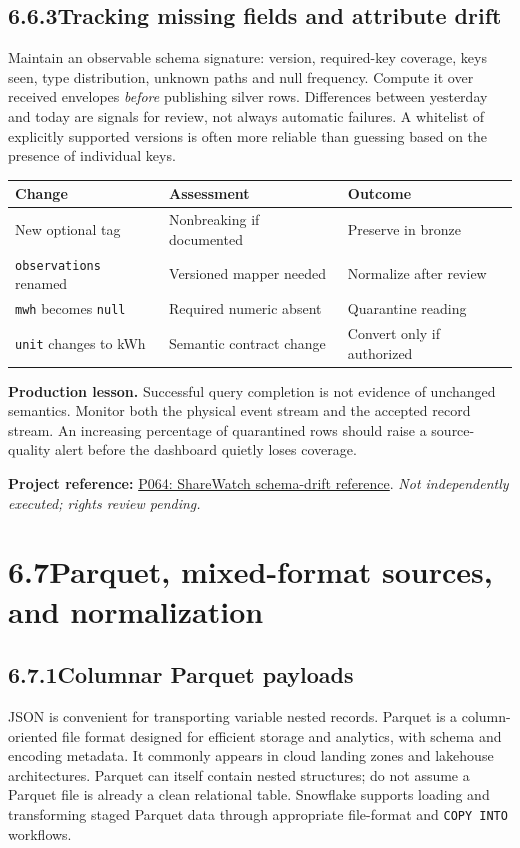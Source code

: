 \documentclass[11pt,twoside]{article}
\newcommand{\topic}[2]{\subsection*{#1\quad #2}}
\newcommand{\repo}[2]{\par\begingroup\fontsize{8.0}{9.6}\selectfont\sffamily\color{inkgray}\textbf{Project reference:} \href{#2}{#1}. \textit{Not independently executed; rights review pending.}\par\endgroup}
\begin{document}
\topic{6.6.3}{Tracking missing fields and attribute drift}
Maintain an observable schema signature: version, required-key coverage, keys seen, type distribution, unknown paths and null frequency. Compute it over received envelopes \emph{before} publishing silver rows. Differences between yesterday and today are signals for review, not always automatic failures. A whitelist of explicitly supported versions is often more reliable than guessing based on the presence of individual keys.

\begin{center}\small\begin{tabularx}{\linewidth}{@{}p{31mm}p{44mm}X@{}}\toprule
Change & Assessment & Outcome\\\midrule
New optional tag & Nonbreaking if documented & Preserve in bronze\\
\texttt{observations} renamed & Versioned mapper needed & Normalize after review\\
\texttt{mwh} becomes \texttt{null} & Required numeric absent & Quarantine reading\\
\texttt{unit} changes to kWh & Semantic contract change & Convert only if authorized\\\bottomrule\end{tabularx}\end{center}
\textbf{Production lesson.} Successful query completion is not evidence of unchanged semantics. Monitor both the physical event stream and the accepted record stream. An increasing percentage of quarantined rows should raise a source-quality alert before the dashboard quietly loses coverage.
\repo{P064: ShareWatch schema-drift reference}{https://github.com/Snowflake-Labs/sfguide-monitor-schema-drift-in-data-shares-with-sharewatch}
\newpage
\section*{6.7\quad Parquet, mixed-format sources, and normalization}
\topic{6.7.1}{Columnar Parquet payloads}
JSON is convenient for transporting variable nested records. Parquet is a column-oriented file format designed for efficient storage and analytics, with schema and encoding metadata. It commonly appears in cloud landing zones and lakehouse architectures. Parquet can itself contain nested structures; do not assume a Parquet file is already a clean relational table. Snowflake supports loading and transforming staged Parquet data through appropriate file-format and \texttt{COPY INTO} workflows.
\end{document}
